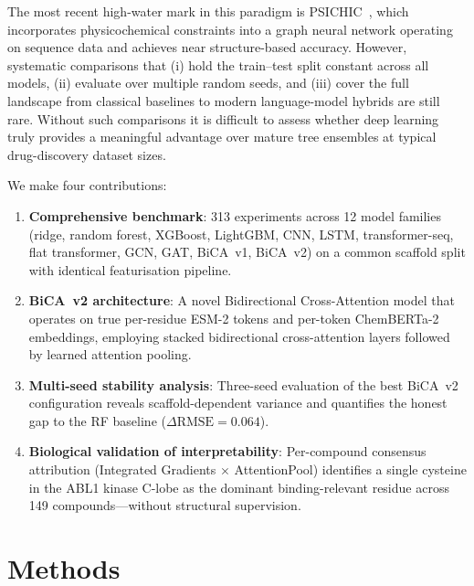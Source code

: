 \documentclass[11pt,twocolumn]{article}
\begin{document}
The most recent high-water mark in this paradigm is
PSICHIC~\cite{tran2024psichic}, which incorporates physicochemical
constraints into a graph neural network operating on sequence data and
achieves near structure-based accuracy.  However, systematic comparisons
that (i) hold the train--test split constant across all models, (ii) evaluate
over multiple random seeds, and (iii) cover the full landscape from classical
baselines to modern language-model hybrids are still rare.  Without such
comparisons it is difficult to assess whether deep learning truly provides a
meaningful advantage over mature tree ensembles at typical drug-discovery
dataset sizes.

We make four contributions:
\begin{enumerate}
  \item \textbf{Comprehensive benchmark}: 313 experiments across 12 model
    families (ridge, random forest, XGBoost, LightGBM, CNN, LSTM,
    transformer-seq, flat transformer, GCN, GAT, BiCA~v1, BiCA~v2) on a
    common scaffold split with identical featurisation pipeline.

  \item \textbf{BiCA~v2 architecture}: A novel Bidirectional Cross-Attention
    model that operates on true per-residue ESM-2 tokens and per-token
    ChemBERTa-2 embeddings, employing stacked bidirectional cross-attention
    layers followed by learned attention pooling.

  \item \textbf{Multi-seed stability analysis}: Three-seed evaluation of the
    best BiCA~v2 configuration reveals scaffold-dependent variance and
    quantifies the honest gap to the RF baseline ($\Delta\text{RMSE}
    = 0.064$).

  \item \textbf{Biological validation of interpretability}: Per-compound
    consensus attribution (Integrated Gradients $\times$ AttentionPool)
    identifies a single cysteine in the ABL1 kinase C-lobe as the dominant
    binding-relevant residue across 149 compounds---without structural
    supervision.
\end{enumerate}

\section{Methods}
\end{document}
